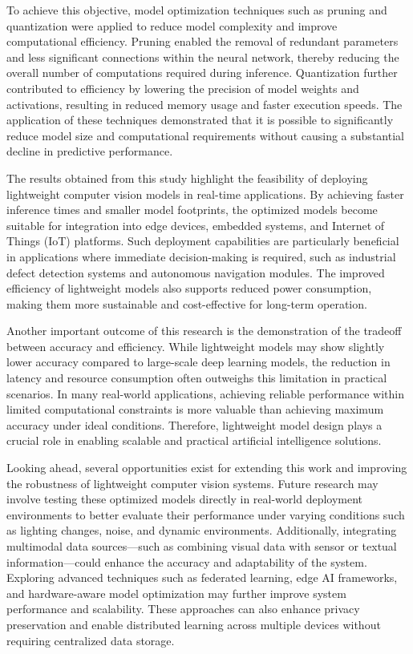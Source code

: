 \documentclass[conference]{IEEEtran}
\begin{document}
To achieve this objective, model optimization techniques such as pruning and quantization were applied to reduce model complexity and improve computational efficiency. Pruning enabled the removal of redundant parameters and less significant connections within the neural network, thereby reducing the overall number of computations required during inference. Quantization further contributed to efficiency by lowering the precision of model weights and activations, resulting in reduced memory usage and faster execution speeds. The application of these techniques demonstrated that it is possible to significantly reduce model size and computational requirements without causing a substantial decline in predictive performance.

The results obtained from this study highlight the feasibility of deploying lightweight computer vision models in real-time applications. By achieving faster inference times and smaller model footprints, the optimized models become suitable for integration into edge devices, embedded systems, and Internet of Things (IoT) platforms. Such deployment capabilities are particularly beneficial in applications where immediate decision-making is required, such as industrial defect detection systems and autonomous navigation modules. The improved efficiency of lightweight models also supports reduced power consumption, making them more sustainable and cost-effective for long-term operation.

Another important outcome of this research is the demonstration of the tradeoff between accuracy and efficiency. While lightweight models may show slightly lower accuracy compared to large-scale deep learning models, the reduction in latency and resource consumption often outweighs this limitation in practical scenarios. In many real-world applications, achieving reliable performance within limited computational constraints is more valuable than achieving maximum accuracy under ideal conditions. Therefore, lightweight model design plays a crucial role in enabling scalable and practical artificial intelligence solutions.

Looking ahead, several opportunities exist for extending this work and improving the robustness of lightweight computer vision systems. Future research may involve testing these optimized models directly in real-world deployment environments to better evaluate their performance under varying conditions such as lighting changes, noise, and dynamic environments. Additionally, integrating multimodal data sources—such as combining visual data with sensor or textual information—could enhance the accuracy and adaptability of the system. Exploring advanced techniques such as federated learning, edge AI frameworks, and hardware-aware model optimization may further improve system performance and scalability. These approaches can also enhance privacy preservation and enable distributed learning across multiple devices without requiring centralized data storage.
\end{document}
